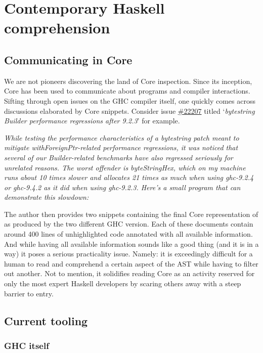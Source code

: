 \section{Contemporary Haskell comprehension}

\subsection{Communicating in Core}
\label{section:communicating_core}

We are not pioneers discovering the land of Core inspection. Since its inception, Core has
been used to communicate about programs and compiler interactions. Sifting through open issues on the
GHC compiler itself, one quickly comes across discussions elaborated by Core snippets. Consider issue
\href{https://gitlab.haskell.org/ghc/ghc/-/issues/22207}{\#22207} titled `\textit{bytestring Builder performance regressions after 9.2.3}' for example.
\hfill \break

\textit{While testing the performance characteristics of a bytestring patch meant to mitigate withForeignPtr-related performance regressions,
it was noticed that several of our Builder-related benchmarks have also regressed seriously for unrelated reasons.
The worst offender is byteStringHex, which on my machine runs about 10 times slower and allocates 21 times as much when using ghc-9.2.4 or ghc-9.4.2
as it did when using ghc-9.2.3. Here's a small program that can demonstrate this slowdown:}
\hfill \break

The author then provides two snippets containing the final Core representation of  as produced by the two different GHC version.
Each of these documents contain around 400 lines of unhighlighted code annotated with all available information. And while having all available information
sounds like a good thing (and it is in a way) it poses a serious practicality issue.
Namely: it is exceedingly difficult for a human to read and comprehend a certain aspect of the AST while having to filter out another.
Not to mention, it solidifies reading Core as an activity reserved for only the most expert Haskell developers by scaring others away with
a steep barrier to entry.

\subsection{Current tooling}

\subsubsection{GHC itself}
\label{section:background:ghc}


